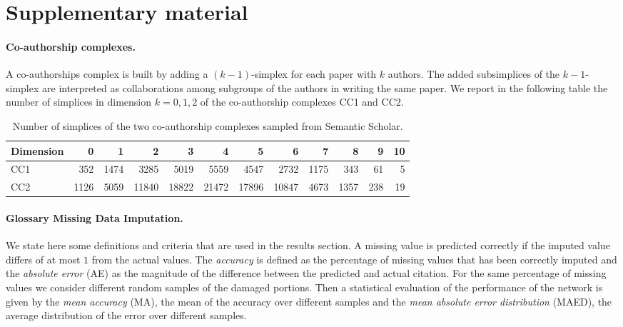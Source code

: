 \section{Supplementary material}\label{sec:supp_material}

\paragraph{Co-authorship complexes.}
A co-authorships complex is built by adding a $(k-1)$-simplex for each paper with $k$ authors. The added subsimplices of the $k-1$-simplex are interpreted as collaborations among subgroups of the authors in writing the same paper. We report in the following table the number of simplices in dimension $k=0,1,2$ of the co-authorship complexes CC1 and CC2.
\begin{table}[htbp]
  \centering
  \scriptsize{
  \begin{tabular}{lrrrrrrrrrrr}
    \toprule
    Dimension   & 0     & 1  & 2     & 3 & 4     & 5 & 6    & 7 & 8   & 9 & 10\\
    \midrule
    CC1 & 352  & 1474  & 3285  & 5019  & 5559  & 4547  & 2732  & 1175  & 343 & 61 & 5\\
    CC2 & 1126 & 5059 & 11840 & 18822 & 21472 & 17896  & 10847 & 4673 & 1357 & 238 & 19\\
    \bottomrule
  \end{tabular}}
  \vspace{2pt}
  \caption{%
  Number of simplices of the two co-authorship complexes sampled from Semantic Scholar.
  } \label{table:Simplices-coauthor}
\end{table}

\paragraph{Glossary Missing Data Imputation.}
We state here some definitions and criteria that are used in the results section.
A missing value is predicted correctly if the imputed value differs of at most $1$ from the actual values. 
The \emph{accuracy} is defined as the percentage of missing values that has been correctly imputed and the \emph{absolute error} (AE) as the magnitude of the difference between the predicted and actual citation.
For the same percentage of missing values we consider different random samples of the damaged portions. Then a statistical evaluation of the performance of the network is given by the \emph{mean accuracy} (MA), the mean of the accuracy over different samples and the \emph{mean absolute error distribution} (MAED), the average distribution of the error over different samples.

